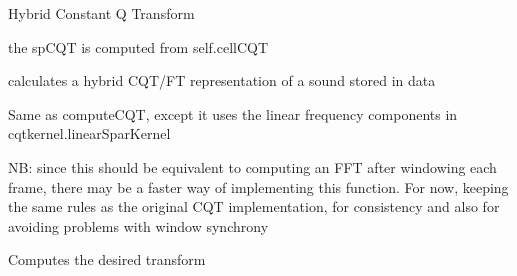 \documentclass[letterpaper,10pt,english]{sphinxmanual}
\begin{document}
\begin{fulllineitems}
\label{reference/tftransforms:pyfasst.tftransforms.minqt.HybridCQTransfo}
Hybrid Constant Q Transform

\begin{fulllineitems}
\label{reference/tftransforms:pyfasst.tftransforms.minqt.HybridCQTransfo.cellCQT2spCQT}
the spCQT is computed from self.cellCQT

\end{fulllineitems}


\begin{fulllineitems}
\label{reference/tftransforms:pyfasst.tftransforms.minqt.HybridCQTransfo.computeHybrid}
calculates a hybrid CQT/FT representation of a sound stored in data

\end{fulllineitems}


\begin{fulllineitems}
\label{reference/tftransforms:pyfasst.tftransforms.minqt.HybridCQTransfo.computeLinearPart}
Same as computeCQT, except it uses the linear frequency components
in cqtkernel.linearSparKernel

NB: since this should be equivalent to computing an FFT after windowing
each frame, there may be a faster way of implementing this function.
For now, keeping the same rules as the original CQT implementation,
for consistency and also for avoiding problems with window synchrony

\end{fulllineitems}


\begin{fulllineitems}
\label{reference/tftransforms:pyfasst.tftransforms.minqt.HybridCQTransfo.computeTransform}
Computes the desired transform


\end{fulllineitems}
\end{fulllineitems}
\end{document}
